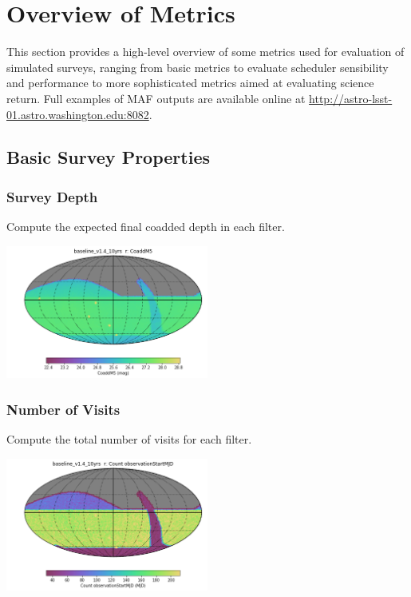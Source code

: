 \section{Overview of Metrics}
This section provides a high-level overview of some metrics used for evaluation of simulated surveys, ranging from basic metrics to evaluate scheduler sensibility and performance to more sophisticated metrics aimed at evaluating science return.
Full examples of MAF outputs are available online at \url{http://astro-lsst-01.astro.washington.edu:8082}.  

{\centering

\subsection{Basic Survey Properties}

\subsubsection{Survey Depth}

Compute the expected final coadded depth in each filter. 

\includegraphics[width=0.5\textwidth]{metric_summary/glance/thumb.baseline_v1_4_10yrs_CoaddM5_r_HEAL_SkyMap.png}

\subsubsection{Number of Visits}

Compute the total number of visits for each filter.

\includegraphics[width=0.5\textwidth]{metric_summary/glance/thumb.baseline_v1_4_10yrs_Count_observationStartMJD_r_HEAL_SkyMap.png}

}
